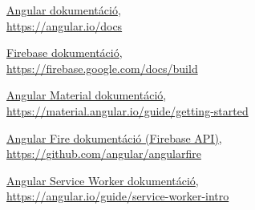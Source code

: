 \documentclass[12pt]{report}
\theoremstyle{definition}
\begin{document}
\vspace*{4cm}






%
%

 
\begin{thebibliography}{9}







	\href{https://angular.io/docs}{Angular dokumentáció}, \\
	\url{https://angular.io/docs}

	\href{https://firebase.google.com/docs/build}{Firebase dokumentáció}, \\
	\url{https://firebase.google.com/docs/build}
	
	\href{https://material.angular.io/guide/getting-started}{Angular Material dokumentáció}, \\
	\url{https://material.angular.io/guide/getting-started}  

	\href{https://github.com/angular/angularfire}
	{Angular Fire dokumentáció (Firebase API)},\\
	\url{https://github.com/angular/angularfire}

	\href{https://angular.io/guide/service-worker-intro}{Angular Service Worker dokumentáció}, \\
	\url{https://angular.io/guide/service-worker-intro}


\end{thebibliography}
\end{document}
